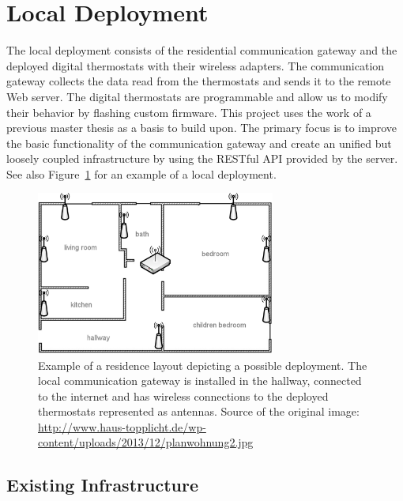 
\section{Local Deployment}
\label{sec:local_infrastructure}

The local deployment consists of the residential communication gateway and the deployed digital thermostats with their wireless adapters.
The communication gateway collects the data read from the thermostats and sends it to the remote Web server.
The digital thermostats are programmable and allow us to modify their behavior by flashing custom firmware.
This project uses the work of a previous master thesis as a basis to build upon\cite{eigenmann2012opportunisticSensing}.
The primary focus is to improve the basic functionality of the communication gateway and create an unified but loosely coupled infrastructure by using the RESTful API provided by the server.
See also Figure~\ref{fig:residence_layout} for an example of a local deployment.

\begin{figure}[h]
	\begin{center}
		\includegraphics[width=0.7\textwidth]{images/residence_layout_schema.png}
	\end{center}
	\caption{Example of a residence layout depicting a possible deployment. The local communication gateway is installed in the hallway, connected to the internet and has wireless connections to the deployed thermostats represented as antennas. Source of the original image: \url{http://www.haus-topplicht.de/wp-content/uploads/2013/12/planwohnung2.jpg}}
	\label{fig:residence_layout}
\end{figure}

\subsection{Existing Infrastructure}

